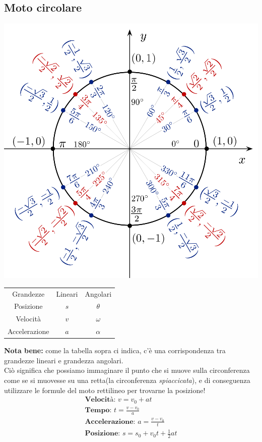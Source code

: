 \subsection{Moto circolare}
\begin{center}
\includegraphics[width=0.8\linewidth]{Cinematica/circonferenza-goniometrica.png}
\end{center}
\begin{center}
\begin{tabular}{ c c c }
    Grandezze & Lineari & Angolari \\
    Posizione & $s$ & $\theta$ \\
    Velocità & $v$ & $\omega$ \\
    Accelerazione & $a$ & $\alpha$ \\
\end{tabular}
\end{center}
\textbf{Nota bene: } come la tabella sopra ci indica, c'è una corrispondenza tra grandezze lineari e grandezza angolari. \\ Ciò significa che possiamo immaginare il punto che si muove sulla circonferenza come se si muovesse su una retta(la circonferenza \textit{spiaccicata}), e di conseguenza utilizzare le formule del moto rettilineo per trovarne la posizione!
\begin{gather*}
    \textbf{Velocità: } v = v_0 + a t \\
    \textbf{Tempo: } t = \frac{v - v_0}{a} \\
    \textbf{Accelerazione: } a = \frac{v - v_0}{t} \\
    \textbf{Posizione: } s = s_0 + v_0 t + \frac{1}{2} a t
\end{gather*}
